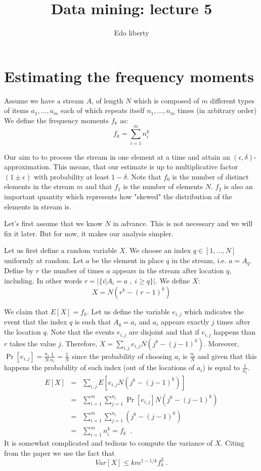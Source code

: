 \documentclass{article}
\title{Data mining: lecture 5} %
\author{Edo liberty}
\date{\nonumber}
\begin{document}
\maketitle 
\section*{Estimating the frequency moments}
Assume we have a stream $A$, of length $N$ which is composed of $m$ 
different types of items $a_1,\ldots,a_m$ each of which repeats itself $n_1,\ldots,n_m$ times (in arbitrary order)
We define the frequency moments $f_k$ as:
\[
f_k = \sum_{i=1}^{m} n_{i}^{k}
\]

Our aim to to process the stream in one element at a time and attain an $(\epsilon,\delta)$-approximation.
This means, that our estimate is up to multiplicative factor $(1\pm\epsilon)$ with probability at least $1-\delta$.  
Note that $f_0$ is the number of distinct elements in the stream $m$ and that $f_1$ is the number of elements $N$.
$f_2$ is also an important quantity which represents how "skewed" the distribution of the elements in stream is.


Let's first assume that we know $N$ in advance. This is not necessary and we will fix it later. But for now, it makes our
analysis simpler.

Let us first define a random variable $X$. We choose an index $q \in [1,\ldots,N]$ uniformly at random.
Let $a$ be the element in place $q$ in the stream, i.e. $a=A_q$. Define by $r$ the number of times $a$ appears in 
the stream after location $q$, including. In other words $r = |\{i | A_i = a \;,\; i\ge q\}|$.
We define $X$:
\[
X = N(r^k - (r-1)^k)
\]

We claim that $E[X] = f_k$. Let us define the variable $e_{i,j}$ which indicates the event that 
the index $q$ is such that $A_q = a_i$ and $a_i$ appears exactly $j$ times after the location $q$.
Note that the events $e_{i,j}$ are disjoint and that if $e_{i,j}$ happens than $r$ takes the value $j$. 
Therefore, $X = \sum_{i,j} e_{i,j}N(j^k - (j-1)^k)$. Moreover, $\Pr[e_{i,j}] = \frac{n_{i}}{N}\frac{1}{n_i} = \frac{1}{N}$     
since the probability of choosing $a_i$ is $\frac{n_i}{N}$ and given that this happens the probability of each index
(out of the locations of $a_i$) is equal to $\frac{1}{n_i}$.
\begin{eqnarray*}
E[X] &=& \sum_{i,j} E[e_{i,j}N(j^k - (j-1)^k)]\\
&=&\sum_{i=1}^{m}\sum_{j=1}^{n_i} \Pr[e_{i,j}]N(j^k - (j-1)^k)\\
&=&\sum_{i=1}^{m}\sum_{j=1}^{n_i} (j^k - (j-1)^k)\\
&=&\sum_{i=1}^{m} n_{i}^{k} = f_k \;\; . 
\end{eqnarray*}
It is somewhat complicated and tedious to compute the variance of $X$. Citing from the paper \cite{}
we use the fact that 
\[
Var[X] \le km^{1-1/k}f_{k}^{2} \; .
\] 
\end{document}

